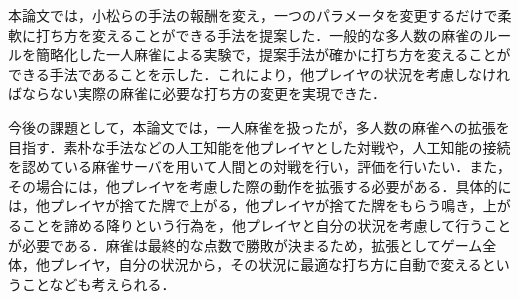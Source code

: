 本論文では，小松らの手法の報酬を変え，一つのパラメータを変更するだけで柔軟に打ち方を変えることができる手法を提案した．一般的な多人数の麻雀のルールを簡略化した一人麻雀による実験で，提案手法が確かに打ち方を変えることができる手法であることを示した．これにより，他プレイヤの状況を考慮しなければならない実際の麻雀に必要な打ち方の変更を実現できた．

今後の課題として，本論文では，一人麻雀を扱ったが，多人数の麻雀への拡張を目指す．素朴な手法などの人工知能を他プレイヤとした対戦や，人工知能の接続を認めている麻雀サーバを用いて人間との対戦を行い，評価を行いたい．また，その場合には，他プレイヤを考慮した際の動作を拡張する必要がある．具体的には，他プレイヤが捨てた牌で上がる，他プレイヤが捨てた牌をもらう鳴き，上がることを諦める降りという行為を，他プレイヤと自分の状況を考慮して行うことが必要である．麻雀は最終的な点数で勝敗が決まるため，拡張としてゲーム全体，他プレイヤ，自分の状況から，その状況に最適な打ち方に自動で変えるということなども考えられる．